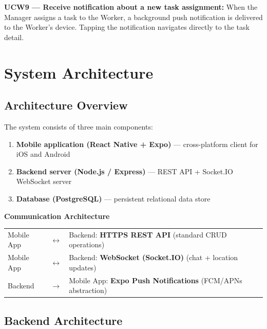 \documentclass[12pt,a4paper]{article}
\begin{document}
\textbf{UCW9 --- Receive notification about a new task assignment:} When the Manager assigns a task to the Worker, a background push notification is delivered to the Worker's device. Tapping the notification navigates directly to the task detail.

\section{System Architecture}

\subsection{Architecture Overview}

The system consists of three main components:

\begin{enumerate}[noitemsep]
    \item \textbf{Mobile application (React Native + Expo)} --- cross-platform client for iOS and Android
    \item \textbf{Backend server (Node.js / Express)} --- REST API + Socket.IO WebSocket server
    \item \textbf{Database (PostgreSQL)} --- persistent relational data store
\end{enumerate}

\begin{mdframed}[backgroundcolor=lightgray, linecolor=headerblue, linewidth=1pt]
\begin{center}
\textbf{Communication Architecture}\\[0.5em]
\begin{tabular}{lcl}
Mobile App & $\longleftrightarrow$ & Backend: \textbf{HTTPS REST API} (standard CRUD operations) \\[0.3em]
Mobile App & $\longleftrightarrow$ & Backend: \textbf{WebSocket (Socket.IO)} (chat + location updates) \\[0.3em]
Backend    & $\longrightarrow$    & Mobile App: \textbf{Expo Push Notifications} (FCM/APNs abstraction) \\
\end{tabular}
\end{center}
\end{mdframed}

\subsection{Backend Architecture}
\end{document}
